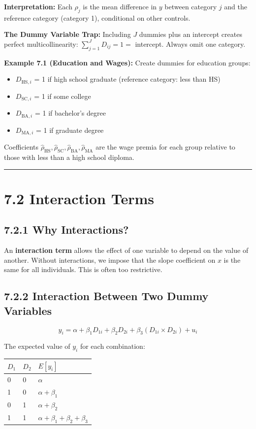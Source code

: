 \textbf{Interpretation:} Each $\rho_j$ is the mean difference in $y$ between category $j$ and the reference category (category 1), conditional on other controls.

\textbf{The Dummy Variable Trap:} Including $J$ dummies plus an intercept creates perfect multicollinearity: $\sum_{j=1}^J D_{ij} = 1 = $ intercept. Always omit one category.

\textbf{Example 7.1 (Education and Wages):} Create dummies for education groups:
\begin{itemize}
\item $D_{\text{HS},i}$ = 1 if high school graduate (reference category: less than HS)
\item $D_{\text{SC},i}$ = 1 if some college
\item $D_{\text{BA},i}$ = 1 if bachelor's degree
\item $D_{\text{MA},i}$ = 1 if graduate degree
\end{itemize}

Coefficients $\hat{\rho}_{\text{HS}}, \hat{\rho}_{\text{SC}}, \hat{\rho}_{\text{BA}}, \hat{\rho}_{\text{MA}}$ are the wage premia for each group relative to those with less than a high school diploma.

\medskip\hrule\medskip

\section{7.2 Interaction Terms}

\subsection{7.2.1 Why Interactions?}

An \textbf{interaction term} allows the effect of one variable to depend on the value of another. Without interactions, we impose that the slope coefficient on $x$ is the same for all individuals. This is often too restrictive.

\subsection{7.2.2 Interaction Between Two Dummy Variables}

\[
y_i = \alpha + \beta_1 D_{1i} + \beta_2 D_{2i} + \beta_3 (D_{1i} \times D_{2i}) + u_i
\]

The expected value of $y_i$ for each combination:

\begin{center}
\begin{tabular}{@{} l l l @{}}
\toprule
\textbf{$D_1$} & \textbf{$D_2$} & \textbf{$E[y_i]$} \\
\midrule
0 & 0 & $\alpha$ \\
1 & 0 & $\alpha + \beta_1$ \\
0 & 1 & $\alpha + \beta_2$ \\
1 & 1 & $\alpha + \beta_1 + \beta_2 + \beta_3$ \\
\bottomrule
\end{tabular}
\end{center}

